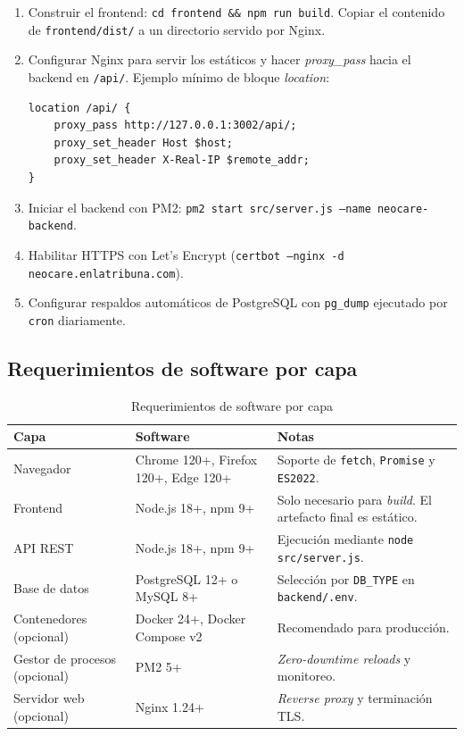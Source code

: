 \documentclass[12pt,letterpaper]{article}
\begin{document}
\begin{enumerate}
    \item Construir el frontend: \texttt{cd frontend \&\& npm run build}. Copiar el contenido de \texttt{frontend/dist/} a un directorio servido por Nginx.
    \item Configurar Nginx para servir los estáticos y hacer \textit{proxy\_pass} hacia el backend en \texttt{/api/}. Ejemplo mínimo de bloque \textit{location}:
    \begin{verbatim}
location /api/ {
    proxy_pass http://127.0.0.1:3002/api/;
    proxy_set_header Host $host;
    proxy_set_header X-Real-IP $remote_addr;
}
    \end{verbatim}
    \item Iniciar el backend con PM2: \texttt{pm2 start src/server.js --name neocare-backend}.
    \item Habilitar HTTPS con Let's Encrypt (\texttt{certbot --nginx -d neocare.enlatribuna.com}).
    \item Configurar respaldos automáticos de PostgreSQL con \texttt{pg\_dump} ejecutado por \texttt{cron} diariamente.
\end{enumerate}

\subsection{Requerimientos de software por capa}

\begin{longtable}{p{}p{}p{}}
\caption{Requerimientos de software por capa}\\\toprule
\textbf{Capa} & \textbf{Software} & \textbf{Notas} \\\midrule
\endhead
Navegador & Chrome 120+, Firefox 120+, Edge 120+ & Soporte de \texttt{fetch}, \texttt{Promise} y \texttt{ES2022}.\\\hline
Frontend & Node.js 18+, npm 9+ & Solo necesario para \textit{build}. El artefacto final es estático.\\\hline
API REST & Node.js 18+, npm 9+ & Ejecución mediante \texttt{node src/server.js}.\\\hline
Base de datos & PostgreSQL 12+ o MySQL 8+ & Selección por \texttt{DB\_TYPE} en \texttt{backend/.env}.\\\hline
Contenedores (opcional) & Docker 24+, Docker Compose v2 & Recomendado para producción.\\\hline
Gestor de procesos (opcional) & PM2 5+ & \textit{Zero-downtime reloads} y monitoreo.\\\hline
Servidor web (opcional) & Nginx 1.24+ & \textit{Reverse proxy} y terminación TLS.\\\bottomrule
\end{longtable}
\end{document}
